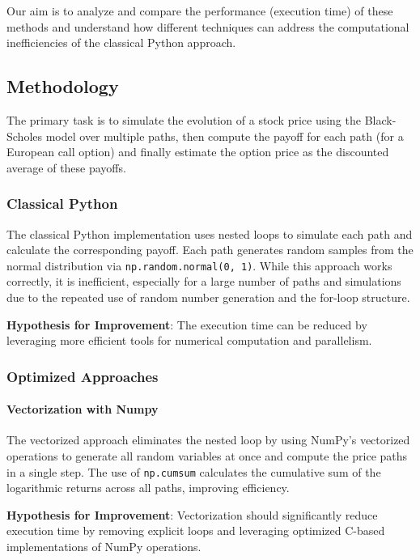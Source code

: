 \documentclass[12pt,a4paper]{report}
\begin{document}
Our aim is to analyze and compare the performance (execution time) of these methods and understand how different techniques can address the computational inefficiencies of the classical Python approach.

\subsection{Methodology}

The primary task is to simulate the evolution of a stock price using the Black-Scholes model over multiple paths, then compute the payoff for each path (for a European call option) and finally estimate the option price as the discounted average of these payoffs.

\subsubsection{Classical Python}

The classical Python implementation uses nested loops to simulate each path and calculate the corresponding payoff. Each path generates random samples from the normal distribution via \texttt{np.random.normal(0, 1)}. While this approach works correctly, it is inefficient, especially for a large number of paths and simulations due to the repeated use of random number generation and the for-loop structure.

\textbf{Hypothesis for Improvement}: The execution time can be reduced by leveraging more efficient tools for numerical computation and parallelism.

\subsubsection{Optimized Approaches}

\paragraph{Vectorization with Numpy}  
The vectorized approach eliminates the nested loop by using NumPy's vectorized operations to generate all random variables at once and compute the price paths in a single step. The use of \texttt{np.cumsum} calculates the cumulative sum of the logarithmic returns across all paths, improving efficiency.

\textbf{Hypothesis for Improvement}: Vectorization should significantly reduce execution time by removing explicit loops and leveraging optimized C-based implementations of NumPy operations.
\end{document}
